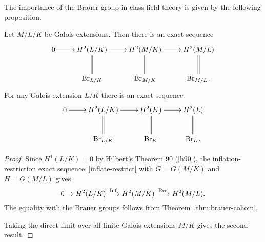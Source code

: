 %
The importance of the Brauer group in class field theory is given by the following proposition.
\begin{thm}
Let $M/L/K$ be Galois extensions. Then there is an exact sequence
\[
\xymatrix{
0\ar[r] & H^2(L/K)\ar[r]\ar@{=}[d] & H^2(M/K)\ar[r]\ar@{=}[d] & H^2(M/L)\ar@{=}[d]\\
& \Br_{L/K} & \Br_{M/K} & \Br_{M/L}.
}
\]
For any Galois extension $L/K$ there is an exact sequence
\[
\xymatrix{
0\ar[r] & H^2(L/K)\ar[r]\ar@{=}[d] & H^2(K)\ar[r]\ar@{=}[d] & H^2(L)\ar@{=}[d]\\
& \Br_{L/K} & \Br_{K} & \Br_{L}.
}
\]
\end{thm}
\begin{proof}
Since $H^1(L/K)=0$ by Hilbert's Theorem 90 (\ref{h90}), 
the inflation-restriction exact sequence~\ref{inflate-restrict} with $G=G(M/K)$ and $H=G(M/L)$ gives
\[
0\to H^2(L/K)\xrightarrow{\operatorname{Inf}} H^2(M/K)\xrightarrow{\operatorname{Res}} H^2(M/L). 
\]
The equality with the Brauer groups follows from Theorem~\ref{thm:brauer-cohom}.

Taking the direct limit over all finite Galois extensions $M/K$ gives the second result.
\end{proof}

